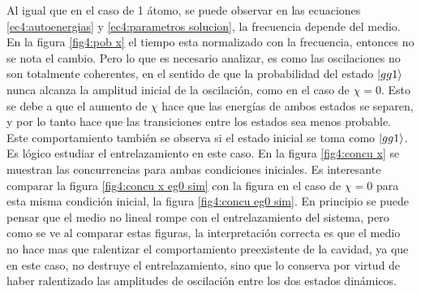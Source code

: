 Al igual que en el caso de 1 átomo, se puede observar en las ecuaciones \ref{ec4:autoenergias} y \ref{ec4:parametros solucion}, la frecuencia depende del medio. En la figura \ref{fig4:pob x} el tiempo esta normalizado con la frecuencia, entonces no se nota el cambio. Pero lo que es necesario analizar, es como las oscilaciones no son totalmente coherentes, en el sentido de que la probabilidad del estado $\ket{gg1}$ nunca alcanza la amplitud inicial de la oscilación, como en el caso de $\chi=0$. Esto se debe a que el aumento de $\chi$ hace que las energías de ambos estados se separen, y por lo tanto hace que las transiciones entre los estados sea menos probable. Este comportamiento también se observa si el estado inicial se toma como $\ket{gg1}$. Es lógico estudiar el entrelazamiento en este caso. En la figura \ref{fig4:concu x} se muestran las concurrencias para ambas condiciones iniciales. Es interesante comparar la figura \ref{fig4:concu x eg0 sim} con la figura en el caso de $\chi=0$ para esta misma condición inicial, la figura \ref{fig4:concu eg0 sim}. En principio se puede pensar que el medio no lineal rompe con el entrelazamiento del sistema, pero como se ve al comparar estas figuras, la interpretación correcta es que el medio no hace mas que ralentizar el comportamiento preexistente de la cavidad, ya que en este caso, no destruye el entrelazamiento, sino que lo conserva por virtud de haber ralentizado las amplitudes de oscilación entre los dos estados dinámicos.
